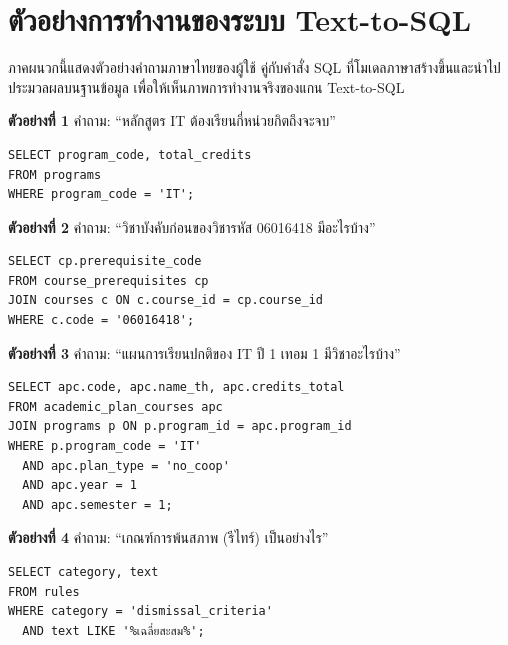 \chapter{ตัวอย่างการทำงานของระบบ Text-to-SQL}

ภาคผนวกนี้แสดงตัวอย่างคำถามภาษาไทยของผู้ใช้ คู่กับคำสั่ง SQL ที่โมเดลภาษาสร้างขึ้นและนำไปประมวลผลบนฐานข้อมูล เพื่อให้เห็นภาพการทำงานจริงของแกน Text-to-SQL

\vskip0.5cm
\noindent\textbf{ตัวอย่างที่ 1} คำถาม: ``หลักสูตร IT ต้องเรียนกี่หน่วยกิตถึงจะจบ''

\begin{verbatim}
SELECT program_code, total_credits
FROM programs
WHERE program_code = 'IT';
\end{verbatim}

\noindent\textbf{ตัวอย่างที่ 2} คำถาม: ``วิชาบังคับก่อนของวิชารหัส 06016418 มีอะไรบ้าง''

\begin{verbatim}
SELECT cp.prerequisite_code
FROM course_prerequisites cp
JOIN courses c ON c.course_id = cp.course_id
WHERE c.code = '06016418';
\end{verbatim}

\noindent\textbf{ตัวอย่างที่ 3} คำถาม: ``แผนการเรียนปกติของ IT ปี 1 เทอม 1 มีวิชาอะไรบ้าง''

\begin{verbatim}
SELECT apc.code, apc.name_th, apc.credits_total
FROM academic_plan_courses apc
JOIN programs p ON p.program_id = apc.program_id
WHERE p.program_code = 'IT'
  AND apc.plan_type = 'no_coop'
  AND apc.year = 1
  AND apc.semester = 1;
\end{verbatim}

\noindent\textbf{ตัวอย่างที่ 4} คำถาม: ``เกณฑ์การพ้นสภาพ (รีไทร์) เป็นอย่างไร''

\begin{verbatim}
SELECT category, text
FROM rules
WHERE category = 'dismissal_criteria'
  AND text LIKE '%เฉลี่ยสะสม%';
\end{verbatim}
